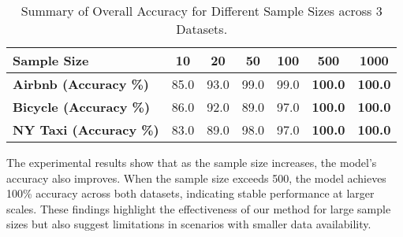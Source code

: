\begin{table}[ht]
    \centering
    \small
    \caption{Summary of Overall Accuracy for Different Sample Sizes across 3 Datasets.
    }
    \begin{tabular}{@{}lcccccc@{}}
        \toprule
        \textbf{Sample Size} & \textbf{10} & \textbf{20} & \textbf{50} & \textbf{100} & \textbf{500} & \textbf{1000} \\ \midrule
        \textbf{Airbnb (Accuracy \%)}  & 85.0 & 93.0 & 99.0 & 99.0 & \textbf{100.0} & \textbf{100.0} \\
        \textbf{Bicycle (Accuracy \%)} & 86.0 & 92.0 & 89.0 & 97.0 & \textbf{100.0} & \textbf{100.0}
        \\
        \textbf{NY Taxi (Accuracy \%)} & 83.0 & 89.0 & 98.0 & 97.0 & \textbf{100.0} & \textbf{100.0}
        \\ \bottomrule
    \end{tabular}
    \label{tab:accuracy_summary}
\end{table}

The experimental results show that as the sample size increases, the model's accuracy also improves. When the sample size exceeds 500, the model achieves 100\% accuracy across both datasets, indicating stable performance at larger scales. These findings highlight the effectiveness of our method for large sample sizes but also suggest limitations in scenarios with smaller data availability.



%



